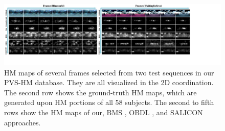 \documentclass[10pt,journal,compsoc]{IEEEtran}
\begin{document}
\begin{figure}

         \begin{center}

                   \centerline{\includegraphics[width=2\columnwidth]{figures/experiment/objective_result_1}}%

                   \caption{\footnotesize{HM maps of several frames selected from two test sequences in our PVS-HM database. They are all visualized in the 2D coordination.  The second row shows the ground-truth HM maps, which are generated upon HM portions of all 58 subjects. The second to fifth rows show the HM maps of our, BMS \cite{zhang2016exploiting} , OBDL \cite{hossein2015many}, and {SALICON} approaches. }}

                   \label{figure-object}

         \end{center}

\end{figure}

\end{document}

